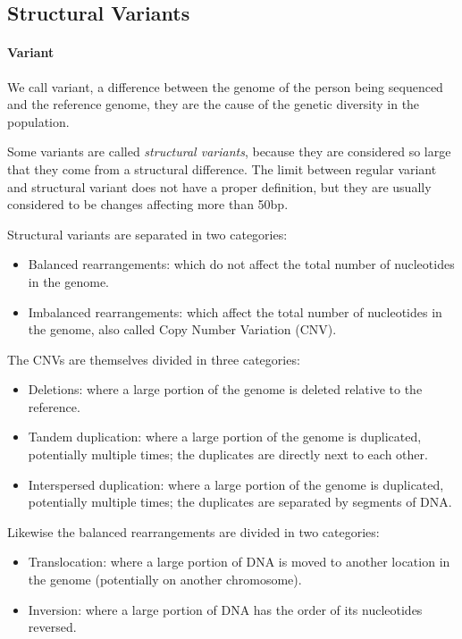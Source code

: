 \documentclass{article}
\begin{document}
\subsection{Structural Variants}

\paragraph{Variant} We call variant, a difference between the genome of the person being sequenced and the reference genome, they are the cause of the genetic diversity in the population.

Some variants are called \emph{structural variants}, because they are considered so large that they come from a structural difference. The limit between regular variant and structural variant does not have a proper definition, but they are usually considered to be changes affecting more than 50bp.

Structural variants are separated in two categories:
\begin{itemize}
    \item Balanced rearrangements: which do not affect the total number of nucleotides in the genome.
    \item Imbalanced rearrangements: which affect the total number of nucleotides in the genome, also called Copy Number Variation (CNV).
\end{itemize}

The CNVs are themselves divided in three categories:
\begin{itemize}
    \item Deletions: where a large portion of the genome is deleted relative to the reference.
    \item Tandem duplication: where a large portion of the genome is duplicated, potentially multiple times; the duplicates are directly next to each other.
    \item Interspersed duplication: where a large portion of the genome is duplicated, potentially multiple times;
    the duplicates are separated by segments of DNA.
\end{itemize}

Likewise the balanced rearrangements are divided in two categories:
\begin{itemize}
    \item Translocation: where a large portion of DNA is moved to another location in the genome (potentially on another chromosome).
    \item Inversion: where a large portion of DNA has the order of its nucleotides reversed.
\end{itemize}
\end{document}
